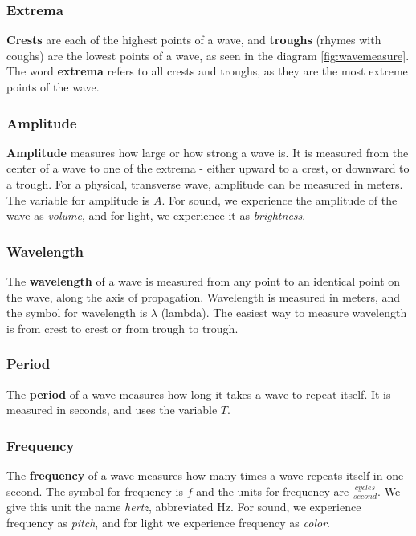 	\subsubsection{Extrema}     
	
	\textbf{Crests} are each of the highest points of a wave, and \textbf{troughs} (rhymes with coughs) are the lowest points of a wave, as seen in the diagram \ref{fig:wavemeasure}.  The word \textbf{extrema} refers to all crests and troughs, as they are the most extreme points of the wave. 
	
	\subsubsection{Amplitude}   \textbf{Amplitude} measures how large or how strong a wave is.  It is measured from the center of a wave to one of the extrema - either upward to a crest, or downward to a trough.  For a physical, transverse wave, amplitude can be measured in meters.  The variable for amplitude is $A$.  For sound, we experience the amplitude of the wave as \textit{volume}, and for light, we experience it as \textit{brightness}.
	
	\subsubsection{Wavelength} 
	The \textbf{wavelength} of a wave is measured from any point to an identical point on the wave, along the axis of propagation.  Wavelength is measured in meters, and the symbol for wavelength is $\lambda$ (lambda).  The easiest way to measure wavelength is from crest to crest or from trough to trough. 
	
	\subsubsection{Period}  
	The \textbf{period} of a wave measures how long it takes a wave to repeat itself.  It is measured in seconds, and uses the variable $T$.  
	
	\subsubsection{Frequency}  
	The \textbf{frequency} of a wave measures how many times a wave repeats itself in one second.  The symbol for frequency is $f$ and the units for frequency are $\frac{cycles}{second} $.  We give this unit the name \textit{hertz}, abbreviated Hz. For sound, we experience frequency as \textit{pitch}, and for light we experience frequency as \textit{color}. 
	

